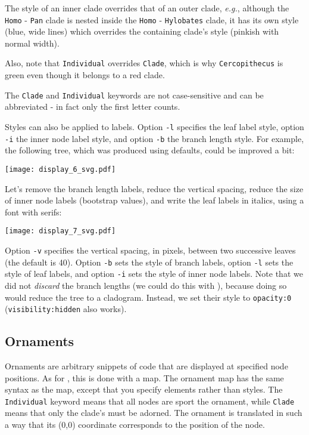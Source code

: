 The style of an inner clade overrides that of an outer clade, \textit{e.g.},
although the \texttt{Homo} - \texttt{Pan} clade is nested inside the
\texttt{Homo} - \texttt{Hylobates} clade, it has its own style (blue, wide
lines) which overrides the containing clade's style (pinkish with normal
width).

Also, note that \texttt{Individual} overrides \texttt{Clade}, which is why
\texttt{Cercopithecus} is green even though it belongs to a red clade.

The \texttt{Clade} and \texttt{Individual} keywords are not case-sensitive and
can be abbreviated - in fact only the first letter counts.

Styles can also be applied to labels. Option \texttt{-l} specifies the leaf
label style, option \texttt{-i} the inner node label style, and option
\texttt{-b} the branch length style. For example, the following tree, which was
produced using defaults, could be improved a bit:


\begin{center}
  \texttt{[image: display\_6\_svg.pdf]}
\end{center}

\noindent{}Let's remove the branch length labels, reduce
the vertical spacing, reduce the size of inner node labels (bootstrap values),
and write the leaf labels in italics, using a font with serifs:

\begin{center}
  \texttt{[image: display\_7\_svg.pdf]}
\end{center}
Option \texttt{-v} specifies the vertical spacing, in pixels, between two
successive leaves (the default is 40). Option \texttt{-b} sets the style of
branch labels, option \texttt{-l} sets the style of leaf labels, and option
\texttt{-i} sets the style of inner node labels. Note that we did not
\emph{discard} the branch lengths (we could do this with \topology), because
doing so would reduce the tree to a cladogram. Instead, we set their \css{}
style to \texttt{opacity:0} (\texttt{visibility:hidden} also works).

\subsection{Ornaments}

Ornaments are arbitrary snippets of \svg{} code that are displayed at specified
node positions. As for \css, this is done with a map. The ornament map has the
same syntax as the \css{} map, except that you specify \svg{} elements rather
than \css{} styles. The \texttt{Individual} keyword means that all nodes are
sport the ornament, while \texttt{Clade} means that only the clade's \lca{}
must be adorned. The ornament is translated in such a way that its (0,0)
coordinate corresponds to the position of the node.

